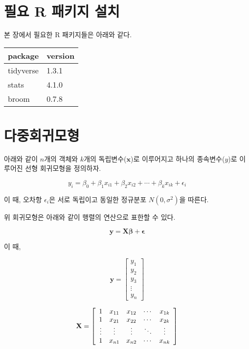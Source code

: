 \documentclass[
]{book}
\begin{document}
\hypertarget{regression-packages-install}{%
\section{필요 R 패키지 설치}\label{regression-packages-install}}

본 장에서 필요한 R 패키지들은 아래와 같다.

\begin{tabular}{l|l}
\hline
package & version\\
\hline
tidyverse & 1.3.1\\
\hline
stats & 4.1.0\\
\hline
broom & 0.7.8\\
\hline
\end{tabular}

\hypertarget{multiple-linear-regression}{%
\section{다중회귀모형}\label{multiple-linear-regression}}

아래와 같이 \(n\)개의 객체와 \(k\)개의 독립변수(\(\mathbf{x}\))로 이루어지고 하나의 종속변수(\(y\))로 이루어진 선형 회귀모형을 정의하자.

\begin{equation}
y_i = \beta_0 + \beta_1 x_{i1} + \beta_2 x_{i2} + \cdots + \beta_k x_{ik} + \epsilon_i
\label{eq:multiple-linear-regression}
\end{equation}

이 때, 오차항 \(\epsilon_i\)은 서로 독립이고 동일한 정규분포 \(N(0, \sigma^2)\)을 따른다.

위 회귀모형은 아래와 같이 행렬의 연산으로 표한할 수 있다.

\begin{equation}
\mathbf{y} = \mathbf{X} \boldsymbol{\beta} + \boldsymbol{\epsilon} \label{eq:multiple-linear-regression-matrix}
\end{equation}

이 때,

\[
\mathbf{y} = \left[ \begin{array}{c}
y_1 \\ y_2 \\ y_3 \\ \vdots \\ y_n
\end{array} \right]
\]

\[
\mathbf{X} = \left[ \begin{array}{c c c c c}
1 & x_{11} & x_{12} & \cdots & x_{1k}\\
1 & x_{21} & x_{22} & \cdots & x_{2k}\\
\vdots & \vdots & \vdots & \ddots & \vdots \\
1 & x_{n1} & x_{n2} & \cdots & x_{nk}
\end{array} \right]
\]
\end{document}
